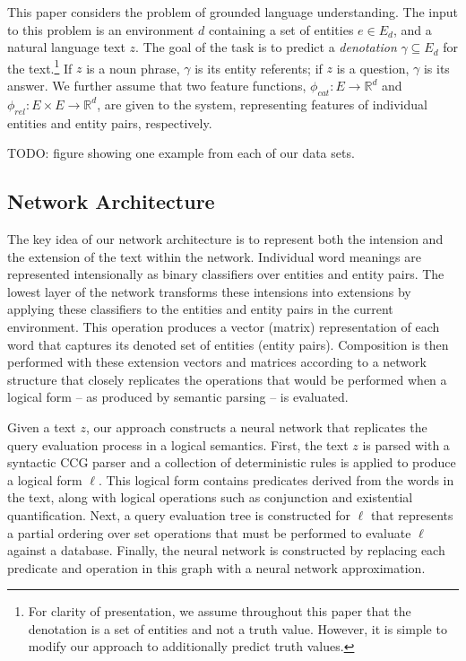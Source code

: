 \documentclass[11pt,letterpaper]{article}
\begin{document}
This paper considers the problem of grounded language
understanding. The input to this problem is an environment $d$
containing a set of entities $e \in E_d$, and a natural language text
$z$.  The goal of the task is to predict a \emph{denotation} $\gamma
\subseteq E_d$ for the text.\footnote{For clarity of presentation, we
  assume throughout this paper that the denotation is a set of
  entities and not a truth value. However, it is simple to modify our
  approach to additionally predict truth values.} If $z$ is a noun
phrase, $\gamma$ is its entity referents; if $z$ is a question,
$\gamma$ is its answer. We further assume that two feature functions,
$\phi_{cat}: E \rightarrow \mathbb{R}^d$ and $\phi_{rel}: E \times E
\rightarrow \mathbb{R}^d$, are given to the system, representing
features of individual entities and entity pairs, respectively.

TODO: figure showing one example from each of
our data sets.

\subsection{Network Architecture}

The key idea of our network architecture is to represent both the
intension and the extension of the text within the network. Individual
word meanings are represented intensionally as binary classifiers over
entities and entity pairs. The lowest layer of the network transforms
these intensions into extensions by applying these classifiers to the
entities and entity pairs in the current environment. This operation
produces a vector (matrix) representation of each word that captures
its denoted set of entities (entity pairs). Composition is then
performed with these extension vectors and matrices according to a
network structure that closely replicates the operations that would be
performed when a logical form -- as produced by semantic parsing -- is
evaluated.

Given a text $z$, our approach constructs a neural network that
replicates the query evaluation process in a logical semantics. First,
the text $z$ is parsed with a syntactic CCG parser and a collection of
deterministic rules is applied to produce a logical form $\ell$. This
logical form contains predicates derived from the words in the text,
along with logical operations such as conjunction and existential
quantification. Next, a query evaluation tree is constructed for
$\ell$ that represents a partial ordering over set operations that
must be performed to evaluate $\ell$ against a database. Finally, the
neural network is constructed by replacing each predicate and
operation in this graph with a neural network approximation.
\end{document}
